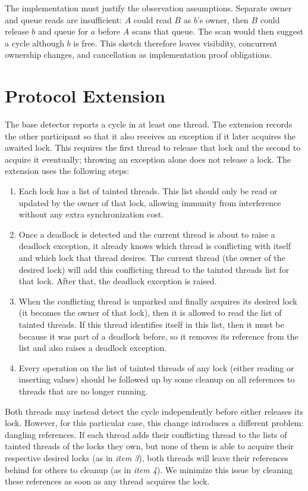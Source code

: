 The implementation must justify the observation assumptions.
Separate owner and queue reads are insufficient: $A$ could read $B$ as $b$'s owner, then $B$ could release $b$ and queue for $a$ before $A$ scans that queue.
The scan would then suggest a cycle although $b$ is free.
This sketch therefore leaves visibility, concurrent ownership changes, and cancellation as implementation proof obligations.

\section{Protocol Extension}

The base detector reports a cycle in at least one thread. The extension records the other participant so that it also receives an exception if it later acquires the awaited lock.
This requires the first thread to release that lock and the second to acquire it eventually; throwing an exception alone does not release a lock.
The extension uses the following steps:

\begin{enumerate}
\item Each lock has a list of tainted threads. This list should only be read or updated by the owner of that lock, allowing immunity from interference without any extra synchronization cost.
\item Once a deadlock is detected and the current thread is about to raise a deadlock exception, it already knows which thread is conflicting with itself and which lock that thread desires. The current thread (the owner of the desired lock) will add this conflicting thread to the tainted threads list for that lock. After that, the deadlock exception is raised.
\item When the conflicting thread is unparked and finally acquires its desired lock (it becomes the owner of that lock), then it is allowed to read the list of tainted threads. If this thread identifies itself in this list, then it must be because it was part of a deadlock before, so it removes its reference from the list and also raises a deadlock exception.
\item Every operation on the list of tainted threads of any lock (either reading or inserting values) should be followed up by some cleanup on all references to threads that are no longer running.
\end{enumerate}

Both threads may instead detect the cycle independently before either releases its lock. However, for this particular case, this change introduces a different problem: dangling references.
If each thread adds their conflicting thread to the lists of tainted threads of the locks they own, 
but none of them is able to acquire their respective desired locks (as in \emph{item 3}),
both threads will leave their references behind for others to cleanup (as in \emph{item 4}).
We minimize this issue by cleaning these references as soon as any thread acquires the lock.

